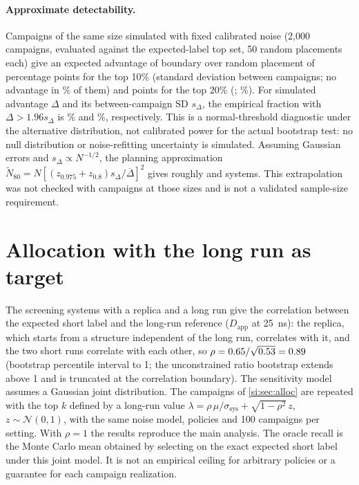 \documentclass[11pt]{article}
\begin{document}
\paragraph{Approximate detectability.} Campaigns of the same size simulated with fixed calibrated noise (2,000 campaigns,
evaluated against the expected-label top set, 50 random placements each) give an expected
advantage of boundary over random placement of \olDetTenAdv{} percentage points for the top 10\%
(standard deviation \olDetTenSd{} between campaigns; no advantage in \olDetTenNoGainPct\% of them)
and \olDetTwentyAdv{} points for the top 20\% (\olDetTwentySd; \olDetTwentyNoGainPct\%).
For simulated advantage $\Delta$ and its between-campaign SD $s_\Delta$, the empirical fraction
with $\Delta>1.96s_\Delta$ is \olDetTenPct\% and \olDetTwentyPct\%, respectively. This is a
normal-threshold diagnostic under the alternative distribution, not calibrated power for the
actual bootstrap test: no null distribution or noise-refitting uncertainty is simulated.
Assuming Gaussian errors and $s_\Delta\propto N^{-1/2}$, the planning approximation
$\widetilde N_{80}=N[(z_{0.975}+z_{0.8})s_\Delta/\overline\Delta]^2$ gives roughly
\olDetTenNScale{} and \olDetTwentyNScale{} systems. This extrapolation was not checked with
campaigns at those sizes and is not a validated sample-size requirement.

\section{Allocation with the long run as target}\label{si:sec:long-target}
The \olN{} screening systems with a replica and a long run give the correlation between the
expected short label and the long-run reference ($D_\mathrm{app}$ at \SI{25}{\nano\second}):
the replica, which starts from a structure independent of the long run, correlates \olCorrBL{}
with it, and the two short runs correlate \olCorrAB{} with each other, so
$\rho = 0.65/\sqrt{0.53} = 0.89$ (bootstrap percentile interval \olRhoLo{} to 1;
the unconstrained ratio bootstrap extends above 1 and is truncated at the correlation boundary).
The sensitivity model assumes a Gaussian joint distribution. The
campaigns of \cref{si:sec:alloc} are repeated with the top $k$ defined by a long-run value
$\lambda = \rho\,\mu/\sigma_\mathrm{sys} + \sqrt{1-\rho^2}\,z$, $z\sim\mathcal{N}(0,1)$, with the
same noise model, policies and 100 campaigns per setting. With $\rho=1$ the results reproduce the
main analysis. The oracle recall is the Monte Carlo mean obtained by selecting on the exact
expected short label under this joint model. It is not an empirical ceiling for arbitrary
policies or a guarantee for each campaign realization.
\end{document}
